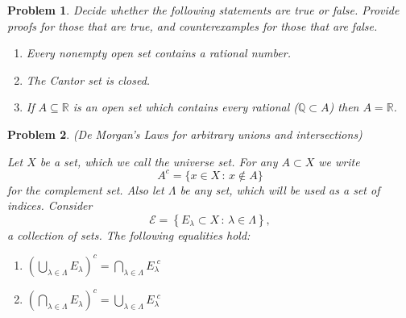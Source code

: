 \documentclass[12pt]{article}
\newtheorem{problem}{Problem}
\newcommand{\QQ}{\ensuremath{\mathbb Q}}
\newcommand{\RR}{\ensuremath{\mathbb R}}
\newcommand{\ds}{\displaystyle}
\begin{document}
\begin{problem} %
Decide whether the following statements are true or false.  Provide proofs for those that are true, and counterexamples for those that are false.

\renewcommand{\labelenumi}{\emph{(\alph{enumi})}}
\begin{enumerate}
\item Every nonempty open set contains a rational number.


\item The Cantor set is closed.


\item If $A\subseteq \RR$ is an open set which contains every rational ($\QQ \subset A$) then $A=\RR$.



\end{enumerate}
\end{problem}


\begin{problem} %
(De Morgan's Laws for arbitrary unions and intersections)

\medskip
\noindent Let $X$ be a set, which we call the universe set.  For any $A\subset X$ we write
    $$A^c = \{x\in X\,:\,x \notin A\}$$
for the complement set.  Also let $\Lambda$ be any set, which will be used as a set of indices.  Consider
	$$\mathcal{E} = \left\{E_\lambda\subset X \,:\,\lambda \in \Lambda \right\},$$
a collection of sets.  The following equalities hold:
\renewcommand{\labelenumi}{\emph{(\roman{enumi})}}
\begin{enumerate}
\item $\ds \left(\bigcup_{\lambda\in\Lambda} E_\lambda\right)^c = \bigcap_{\lambda\in\Lambda} E_\lambda^{\,\,c}$
\item $\ds \left(\bigcap_{\lambda\in\Lambda} E_\lambda\right)^c = \bigcup_{\lambda\in\Lambda} E_\lambda^{\,\,c}$
\end{enumerate}
\end{problem}

\end{document}
